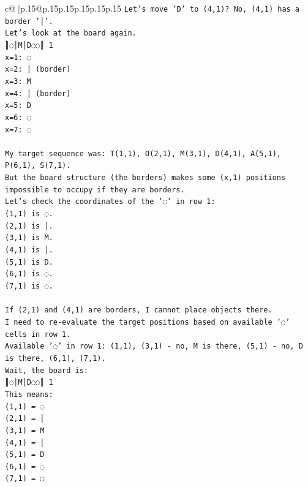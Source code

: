 \documentclass{article}
\begin{document}
{\begin{supertabular}{c@{$\;$}|p{.15\linewidth}@{}p{.15\linewidth}p{.15\linewidth}p{.15\linewidth}p{.15\linewidth}p{.15\linewidth}}
{{{\texttt{Let's move 'D' to (4,1)? No, (4,1) has a border '│'.} \\
\texttt{Let's look at the board again.} \\
\texttt{║◌│M│D◌◌║ 1} \\
\texttt{x=1: ◌} \\
\texttt{x=2: │ (border)} \\
\texttt{x=3: M} \\
\texttt{x=4: │ (border)} \\
\texttt{x=5: D} \\
\texttt{x=6: ◌} \\
\texttt{x=7: ◌} \\
\\ 
\texttt{My target sequence was: T(1,1), O(2,1), M(3,1), D(4,1), A(5,1), P(6,1), S(7,1).} \\
\texttt{But the board structure (the borders) makes some (x,1) positions impossible to occupy if they are borders.} \\
\texttt{Let's check the coordinates of the '◌' in row 1:} \\
\texttt{(1,1) is ◌.} \\
\texttt{(2,1) is │.} \\
\texttt{(3,1) is M.} \\
\texttt{(4,1) is │.} \\
\texttt{(5,1) is D.} \\
\texttt{(6,1) is ◌.} \\
\texttt{(7,1) is ◌.} \\
\\ 
\texttt{If (2,1) and (4,1) are borders, I cannot place objects there.} \\
\texttt{I need to re{-}evaluate the target positions based on available '◌' cells in row 1.} \\
\texttt{Available '◌' in row 1: (1,1), (3,1) {-} no, M is there, (5,1) {-} no, D is there, (6,1), (7,1).} \\
\texttt{Wait, the board is:} \\
\texttt{║◌│M│D◌◌║ 1} \\
\texttt{This means:} \\
\texttt{(1,1) = ◌} \\
\texttt{(2,1) = │} \\
\texttt{(3,1) = M} \\
\texttt{(4,1) = │} \\
\texttt{(5,1) = D} \\
\texttt{(6,1) = ◌} \\
\texttt{(7,1) = ◌} \\
}}}
\end{supertabular}}
\end{document}
